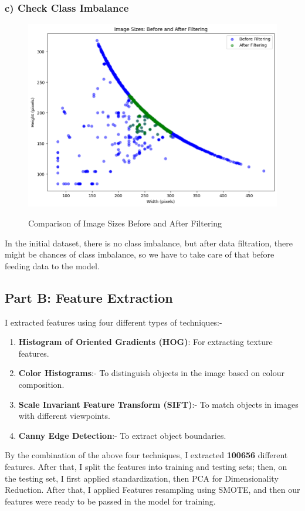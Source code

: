 \documentclass{article}
\begin{document}
\subsubsection*{c) Check Class Imbalance}
\begin{figure}[H] %
    \centering
    \begin{minipage}{0.75\linewidth}
        \centering
        \includegraphics[scale=0.4]{assets/1c.png}
        \caption{Comparison of Image Sizes Before and After Filtering}{}
        \label{fig:1c}
    \end{minipage}
\end{figure}
\hspace{-3pt}
In the initial dataset, there is no class imbalance, but after data filtration, there might be chances of class imbalance, so we have to take care of that before feeding data to the model.

\vspace{10pt}
\subsection*{Part B: Feature Extraction}
\hspace{0pt}I extracted features using four different types of techniques:-

\begin{enumerate}
\item \textbf{Histogram of Oriented Gradients (HOG)}: For extracting texture features.
\item \textbf{Color Histograms}:- To distinguish objects in the image based on colour composition.
\item \textbf{Scale Invariant Feature Transform (SIFT)}:- To match objects in images with different viewpoints.
\item \textbf{Canny Edge Detection}:- To extract object boundaries.
\end{enumerate}
By the combination of the above four techniques, I extracted \textbf{100656} different features. After that, I split the features into training and testing sets; then, on the testing set, I first applied standardization, then PCA for Dimensionality Reduction. After that, I applied Features resampling using SMOTE, and then our features were ready to be passed in the model for training.
\end{document}

